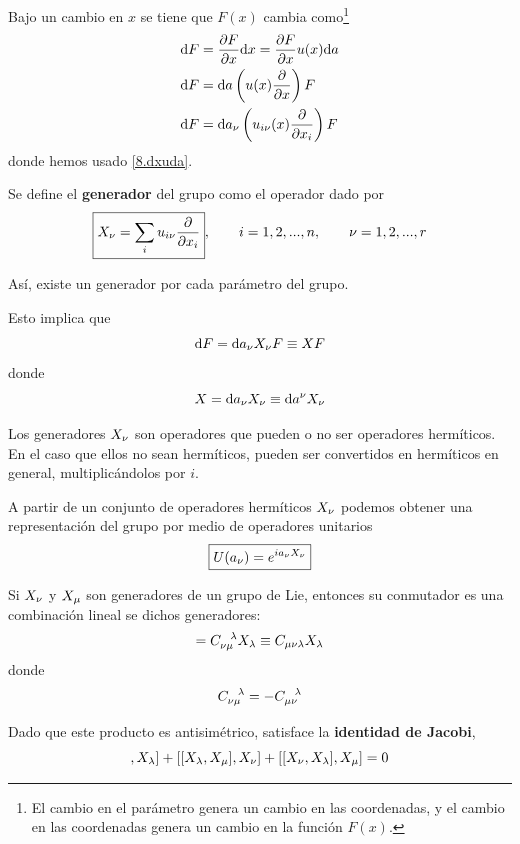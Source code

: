 Bajo un cambio en $x$ se tiene que $F(x)$ cambia como\footnote{El cambio en el parámetro genera un cambio en las coordenadas, y el cambio en las coordenadas genera un cambio en la función $F(x)$.}
\begin{align}
  \dd F&=\pdv{F}{x}\dd x=\pdv{F}{x}u(x)\dd a\\
  \dd F&=\dd a \l(u(x)\pdv{x}\r)F\\
  \dd F&=\dd a_\n \left(u_{i\n }(x)\pdv{x_i}\right)F
\end{align}
donde hemos usado \eqref{8.dxuda}.
\begin{defi}
	Se define el \textbf{generador} del grupo como el operador dado por
	\begin{equation}
  \boxed{X_\nu =\sum_i u_{i\nu }\pdv{x_i}},\qquad i=1,2,...,n,\qquad \nu =1,2,...,r
\end{equation}
\end{defi}
Así, existe un generador por cada parámetro del grupo.

Esto implica que
\begin{equation}
  \dd F=\dd a_\nu X_\nu F\equiv XF
\end{equation}
donde
\begin{equation}
  X=\dd a_\nu X_\nu \equiv \dd a^\nu X_\nu 
\end{equation}

\begin{obs}
	Los generadores $X_\nu$ son operadores que pueden o no ser operadores hermíticos. En el caso que ellos no sean hermíticos, pueden ser convertidos en hermíticos en general, multiplicándolos por $i$.
\end{obs}

\begin{teor}
	A partir de un conjunto de operadores hermíticos $X_\nu$ podemos obtener una representación del grupo por medio de operadores unitarios
	\begin{equation}
 \boxed{U(a_\nu )=e^{i a_\nu X_\nu }}
\end{equation}
\end{teor}

\begin{teor}
	Si $X_\nu$ y $X_\mu$ son generadores de un grupo de Lie, entonces
	su conmutador es una combinación lineal se dichos generadores:
	\begin{equation}
  [X_\n,X_\m ]=C_{\n\m}^{~~\lambda} X_\lambda \equiv C_{\m\n\lambda }X_\lambda
\end{equation}
donde
\begin{equation}
  C_{\nu\mu}^{~~\lambda}=-C_{\mu\nu }^{~~\lambda}
\end{equation}
\end{teor}
Dado que este producto es antisimétrico, satisface la \textbf{identidad de Jacobi},
\begin{equation}
  [[X_\m,X_\n ],X_\lambda]+[[X_\lambda,X_\m  ],X_\n ]+[[X_\n,X_\lambda ],X_\m ]=0
\end{equation}

